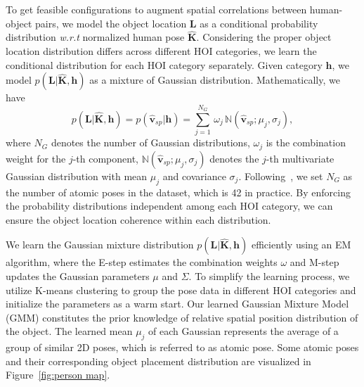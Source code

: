 \documentclass[10pt,twocolumn,letterpaper]{article}
\begin{document}
To get feasible configurations to augment spatial correlations between human-object pairs, we model the object location $\mathbf{L}$ as a conditional probability distribution \textit{w.r.t} normalized human pose $\hat{\mathbf{K}}$. Considering the proper object location distribution differs across different HOI categories, we learn the conditional distribution for each HOI category separately. Given category $\mathbf{h}$, we model $p(\mathbf{L}|\hat{\mathbf{K}}, \mathbf{h})$ as a mixture of Gaussian distribution. Mathematically, we have
\begin{equation}
    p(\mathbf{L}|\hat{\mathbf{K}},\mathbf{h}) = p(\hat{\mathbf{v}}_{sp}|\mathbf{h}) = \sum_{j=1}^{N_G}\,\omega_{j}\, \mathbb{N}(\hat{\mathbf{v}}_{sp}; \mu_j, \sigma_j),
\end{equation}
where $N_G$ denotes the number of Gaussian distributions, $\omega_{j}$ is the combination weight for the $j$-th component, $\mathbb{N}(\hat{\mathbf{v}}_{sp}; \mu_j, \sigma_j)$ denotes the $j$-th multivariate Gaussian distribution with mean $\mu_{j}$ and covariance $\sigma_j$. Following~\cite{andriluka20142d, fang2018learning}, we set $N_G$ as the number of atomic poses in the dataset, which is 42 in practice. By enforcing the probability distributions independent among each HOI category, we can ensure the object location coherence within each distribution.




We learn the Gaussian mixture distribution $p(\mathbf{L}|\hat{\mathbf{K}}, \mathbf{h})$ efficiently using an EM algorithm, where the E-step estimates the combination weights $\omega$ and M-step updates the Gaussian parameters $\mu$ and $\Sigma$. To simplify the learning process, we utilize K-means clustering to group the pose data in different HOI categories and initialize the parameters as a warm start. Our learned Gaussian Mixture Model (GMM) constitutes the prior knowledge of relative spatial position distribution of the object. The learned mean $\mu_j$ of each Gaussian represents the average of a group of similar 2D poses, which is referred to as atomic pose. Some atomic poses and their corresponding object placement distribution are visualized in Figure~\ref{fig:person map}.
\end{document}
